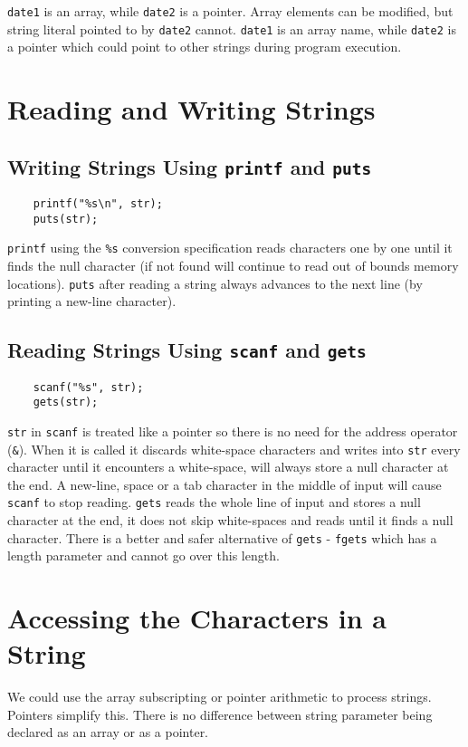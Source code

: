 \documentclass[openany]{book}
\begin{document}
    \texttt{date1} is an array, while \texttt{date2} is a pointer. Array elements can be modified, but string literal pointed to by \texttt{date2} cannot. \texttt{date1} is an array name, while \texttt{date2} is a pointer which could point to other strings during program execution.

    \section{Reading and Writing Strings}
    \subsection*{Writing Strings Using \texttt{printf} and \texttt{puts}}
    \begin{lstlisting}
    printf("%s\n", str);
    puts(str);
    \end{lstlisting}

    \texttt{printf} using the \texttt{\%s} conversion specification reads characters one by one until it finds the null character (if not found will continue to read out of bounds memory locations). \texttt{puts} after reading a string always advances to the next line (by printing a new-line character).

    \subsection*{Reading Strings Using \texttt{scanf} and \texttt{gets}}
    \begin{lstlisting}
    scanf("%s", str);
    gets(str);
    \end{lstlisting}

    \texttt{str} in \texttt{scanf} is treated like a pointer so there is no need for the address operator (\texttt{\&}). When it is called it discards white-space characters and writes into \texttt{str} every character until it encounters a white-space, will always store a null character at the end. A new-line, space or a tab character in the middle of input will cause  \texttt{scanf} to stop reading. \texttt{gets} reads the whole line of input and stores a null character at the end, it does not skip white-spaces and reads until it finds a null character. There is a better and safer alternative of \texttt{gets} - \texttt{fgets} which has a length parameter and cannot go over this length.

    \section{Accessing the Characters in a String}
    We could use the array subscripting or pointer arithmetic to process strings. Pointers simplify this. There is no difference between string parameter being declared as an array or as a pointer.
\end{document}

